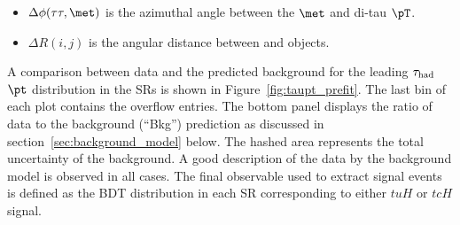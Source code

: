 \begin{itemize}
\item $\Delta\phi(\tau\tau,\met)$ is the azimuthal angle between the $\met$ and di-tau $\pT$.
\item $\Delta R(i,j)$ is the angular distance between  and  objects. 
\end{itemize}
A comparison between data and the predicted background for the leading $\tau_{\mathrm{had}}$ $\pt$ distribution in the SRs 
is shown in Figure~\ref{fig:taupt_prefit}.
The last bin of each plot contains the overflow entries.
The bottom panel displays the ratio of data to the background (``Bkg'') prediction as discussed in section~\ref{sec:background_model} below.
The hashed area represents the total uncertainty of the background.
A good description of the data by the background model is observed in all cases.
The final observable used to extract signal events is defined as the BDT distribution in each SR corresponding to either $tuH$ or $tcH$ signal.
